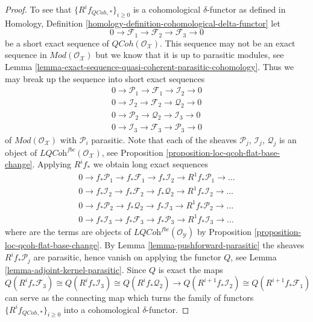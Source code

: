 \documentclass[10pt,a4paper]{amsart}
\theoremstyle{plain}
\theoremstyle{definition}
\theoremstyle{remark}
\numberwithin{equation}{subsection}
\def\QCoh{\mathit{QCoh}}
\begin{document}
\begin{proof}
\medskip\noindent
To see that $\{R^if_{\QCoh, *}\}_{i \geq 0}$ is a cohomological
$\delta$-functor as defined in
Homology, Definition \ref{homology-definition-cohomological-delta-functor}
let
$$
0 \to \mathcal{F}_1 \to \mathcal{F}_2 \to \mathcal{F}_3 \to 0
$$
be a short exact sequence of $\QCoh(\mathcal{O}_\mathcal{X})$.
This sequence may not be an exact sequence in
$\textit{Mod}(\mathcal{O}_\mathcal{X})$ but we know that it is
up to parasitic modules, see
Lemma \ref{lemma-exact-sequence-quasi-coherent-parasitic-cohomology}.
Thus we may break up the sequence into short exact sequences
$$
\begin{matrix}
0 \to \mathcal{P}_1 \to \mathcal{F}_1 \to \mathcal{I}_2 \to 0 \\
0 \to \mathcal{I}_2 \to \mathcal{F}_2 \to \mathcal{Q}_2 \to 0 \\
0 \to \mathcal{P}_2 \to \mathcal{Q}_2 \to \mathcal{I}_3 \to 0 \\
0 \to \mathcal{I}_3 \to \mathcal{F}_3 \to \mathcal{P}_3 \to 0
\end{matrix}
$$
of $\textit{Mod}(\mathcal{O}_\mathcal{X})$ with $\mathcal{P}_i$ parasitic.
Note that each of the sheaves
$\mathcal{P}_j$, $\mathcal{I}_j$, $\mathcal{Q}_j$ is an object of
$\textit{LQCoh}^{fbc}(\mathcal{O}_\mathcal{X})$, see
Proposition \ref{proposition-loc-qcoh-flat-base-change}.
Applying $R^if_*$ we obtain long exact sequences 
$$
\begin{matrix}
0 \to f_*\mathcal{P}_1 \to f_*\mathcal{F}_1 \to f_*\mathcal{I}_2 \to
R^1f_*\mathcal{P}_1 \to \ldots \\
0 \to f_*\mathcal{I}_2 \to f_*\mathcal{F}_2 \to f_*\mathcal{Q}_2 \to
R^1f_*\mathcal{I}_2 \to \ldots \\
0 \to f_*\mathcal{P}_2 \to f_*\mathcal{Q}_2 \to f_*\mathcal{I}_3 \to
R^1f_*\mathcal{P}_2 \to \ldots \\
0 \to f_*\mathcal{I}_3 \to f_*\mathcal{F}_3 \to f_*\mathcal{P}_3 \to
R^1f_*\mathcal{I}_3 \to \ldots
\end{matrix}
$$
where are the terms are objects of
$\textit{LQCoh}^{fbc}(\mathcal{O}_\mathcal{Y})$ by
Proposition \ref{proposition-loc-qcoh-flat-base-change}.
By
Lemma \ref{lemma-pushforward-parasitic}
the sheaves $R^if_*\mathcal{P}_j$ are parasitic, hence vanish on applying
the functor $Q$, see
Lemma \ref{lemma-adjoint-kernel-parasitic}.
Since $Q$ is exact the maps
$$
Q(R^if_*\mathcal{F}_3)
\cong
Q(R^if_*\mathcal{I}_3)
\cong
Q(R^if_*\mathcal{Q}_2)
\rightarrow
Q(R^{i + 1}f_*\mathcal{I}_2)
\cong
Q(R^{i + 1}f_*\mathcal{F}_1)
$$
can serve as the connecting map which turns the family of functors
$\{R^if_{\QCoh, *}\}_{i \geq 0}$
into a cohomological $\delta$-functor.
\end{proof}
\end{document}
